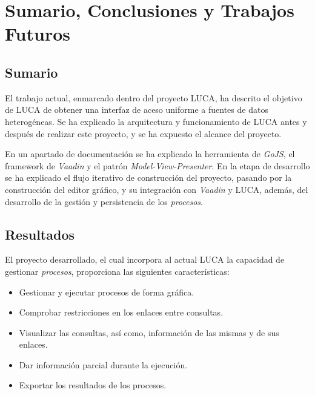 \chapter{Sumario, Conclusiones y Trabajos Futuros}


\section{Sumario}

El trabajo actual, enmarcado dentro del proyecto LUCA, ha descrito el objetivo de LUCA de obtener una interfaz de aceso uniforme a fuentes de datos heterogéneas. Se ha explicado la arquitectura y funcionamiento de LUCA antes y después de realizar este proyecto, y se ha expuesto el alcance del proyecto.

En un apartado de documentación se ha explicado la herramienta de \emph{GoJS}, el framework de \emph{Vaadin} y el patrón \emph{Model-View-Presenter}. En la etapa de desarrollo se ha explicado el flujo iterativo de construcción del proyecto, pasando por la construcción del editor gráfico, y su integración con \emph{Vaadin} y LUCA, además, del desarrollo de la gestión y persistencia de los \emph{procesos}.

\section{Resultados}

El proyecto desarrollado, el cual incorpora al actual LUCA la capacidad de gestionar \emph{procesos}, proporciona las siguientes características:
\begin{itemize}
	\item Gestionar y ejecutar procesos de forma gráfica.
	\item Comprobar restricciones en los enlaces entre consultas.
	\item Visualizar las consultas, así como, información de las mismas y de sus enlaces.
	\item Dar información parcial durante la ejecución.
	\item Exportar los resultados de los procesos.
\end{itemize}

